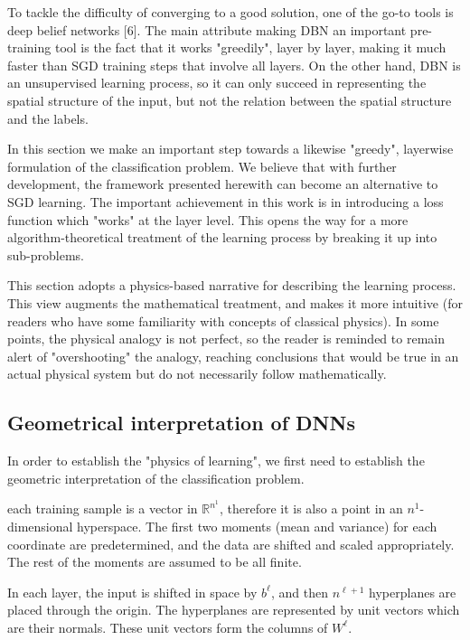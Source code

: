 \documentclass[]{article}
\begin{document}
	  	To tackle the difficulty of converging to a good solution, one of the go-to tools is deep belief networks [6]. The main attribute making DBN an important pre-training tool is the fact that it works "greedily", layer by layer, making it much faster than SGD training steps that involve all layers. On the other hand, DBN is an unsupervised learning process, so it can only succeed in representing the spatial structure of the input, but not the relation between the spatial structure and the labels. 
	  	
	  	In this section we make an important step towards a likewise "greedy", layerwise formulation of the classification problem. We believe that with further development, the framework presented herewith can become an alternative to SGD learning. The important achievement in this work is in introducing a loss function which "works" at the layer level. This opens the way for a more algorithm-theoretical treatment of the learning process by breaking it up into sub-problems.
	  	
	  	This section adopts a physics-based narrative for describing the learning process. This view augments the mathematical treatment, and makes it more intuitive (for readers who have some familiarity with concepts of classical physics). In some points, the physical analogy is not perfect, so the reader is reminded to remain alert of "overshooting" the analogy, reaching conclusions that would be true in an actual physical system but do not necessarily follow mathematically.
	  	
	 \subsection{Geometrical interpretation of DNNs}
	 	In order to establish the "physics of learning", we first need to establish the geometric interpretation of the classification problem.
	 	
	 	each training sample is a vector in $\mathbb{R}^{n^1}$, therefore it is also a point in an $n^1$-dimensional hyperspace. The first two moments (mean and variance) for each coordinate are predetermined, and the data are shifted and scaled appropriately. The rest of the moments are assumed to be all finite.
	 	
	 	In each layer, the input is shifted in space by $b^\ell$, and then $n^{\ell+1}$ hyperplanes are placed through the origin. The hyperplanes are represented by unit vectors which are their normals. These unit vectors form the columns of $W^\ell$.
	 	
\end{document}
